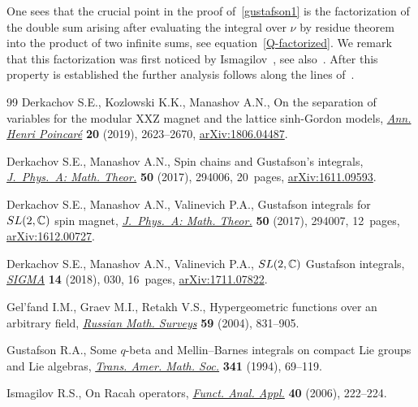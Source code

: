 \documentclass[11pt]{article}
\numberwithin{equation}{section}
\numberwithin{equation}{section}
\begin{document}
One sees that the crucial point in the proof of~\eqref{gustafson1} is the factorization of the double sum arising after evaluating the integral over $\nu$ by residue theorem into the product of two infinite sums, see equation~\eqref{Q-factorized}. We remark that this factorization was first noticed by Ismagi\-lov~\mbox{\cite{MR2265687,MR2354280}}, see also~\cite{Neretin:2019xze}. After this property is established the further analysis follows along the lines of~\cite{Gustafson94}.
\begin{thebibliography}{99}
Derkachov S.E., Kozlowski K.K., Manashov A.N., On the separation of variables
 for the modular {XXZ} magnet and the lattice sinh-{G}ordon models,
 \href{https://doi.org/10.1007/s00023-019-00806-2}{\textit{Ann. Henri Poincar\'e}} \textbf{20} (2019), 2623--2670,
 \href{https://arxiv.org/abs/1806.04487}{arXiv:1806.04487}.

Derkachov S.E., Manashov A.N., Spin chains and {G}ustafson's integrals,
 \href{https://doi.org/10.1088/1751-8121/aa749a}{\textit{J.~Phys.~A: Math. Theor.}} \textbf{50} (2017), 294006, 20~pages,
 \href{https://arxiv.org/abs/1611.09593}{arXiv:1611.09593}.

Derkachov S.E., Manashov A.N., Valinevich P.A., Gustafson integrals for {${\rm
 SL}(2,{\mathbb C})$} spin magnet, \href{https://doi.org/10.1088/1751-8121/aa7480}{\textit{J.~Phys.~A: Math. Theor.}}
 \textbf{50} (2017), 294007, 12~pages, \href{https://arxiv.org/abs/1612.00727}{arXiv:1612.00727}.

Derkachov S.E., Manashov A.N., Valinevich P.A., {${\rm SL}(2,{\mathbb C})$}
 {G}ustafson integrals, \href{https://doi.org/10.3842/SIGMA.2018.030}{\textit{SIGMA}} \textbf{14} (2018), 030, 16~pages,
 \href{https://arxiv.org/abs/1711.07822}{arXiv:1711.07822}.

Gel'fand I.M., Graev M.I., Retakh V.S., Hypergeometric functions over an
 arbitrary field, \href{https://doi.org/10.1070/RM2004v059n05ABEH000771}{\textit{Russian Math. Surveys}} \textbf{59} (2004), 831--905.

Gustafson R.A., Some {$q$}-beta and {M}ellin--{B}arnes integrals on compact
 {L}ie groups and {L}ie algebras, \href{https://doi.org/10.2307/2154615}{\textit{Trans. Amer. Math. Soc.}}
 \textbf{341} (1994), 69--119.

Ismagilov R.S., On {R}acah operators, \href{https://doi.org/10.1007/s10688-006-0034-z}{\textit{Funct. Anal. Appl.}} \textbf{40}
 (2006), 222--224.


\end{thebibliography}
\end{document}
